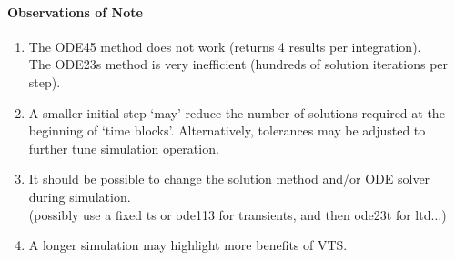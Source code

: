 \documentclass[12pt]{article}
\begin{document}
\begin{table}[!ht]
\end{table}

\paragraph{Observations of Note}
\begin{enumerate}[resume]
\item The ODE45 method does not work (returns 4 results per integration).\\
The ODE23s method is very inefficient (hundreds of solution iterations per step).
\item A smaller initial step `may' reduce the number of solutions required at the beginning of `time blocks'. Alternatively, tolerances may be adjusted to further tune simulation operation.
\item It should be possible to change the solution method and/or ODE solver during simulation.\\ (possibly use a fixed ts or ode113 for transients, and then ode23t for ltd$\ldots$)
\item A longer simulation may highlight more benefits of VTS.

\end{enumerate}
\end{document}
